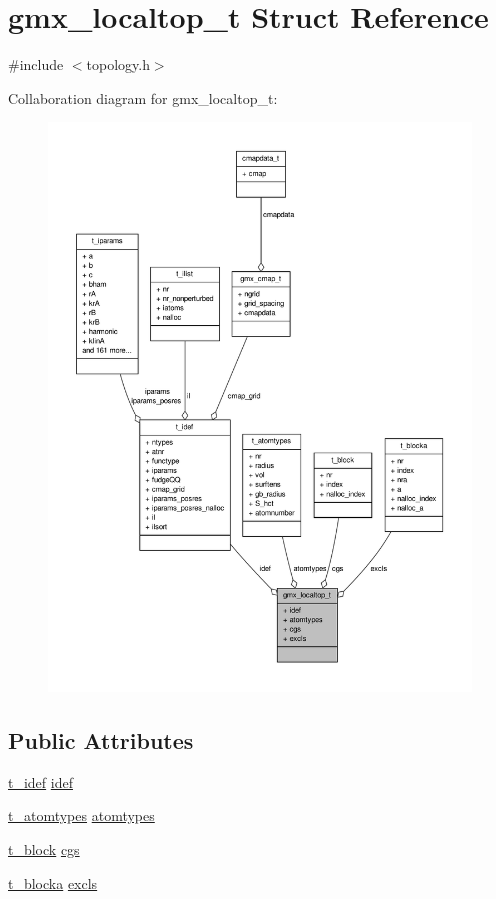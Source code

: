 \hypertarget{structgmx__localtop__t}{\section{gmx\-\_\-localtop\-\_\-t \-Struct \-Reference}
\label{structgmx__localtop__t}
}


{\ttfamily \#include $<$topology.\-h$>$}



\-Collaboration diagram for gmx\-\_\-localtop\-\_\-t\-:
\nopagebreak
\begin{figure}[H]
\begin{center}
\leavevmode
\includegraphics[width=350pt]{structgmx__localtop__t__coll__graph}
\end{center}
\end{figure}
\subsection*{\-Public \-Attributes}
\begin{DoxyCompactItemize}
\item 
\hyperlink{structt__idef}{t\-\_\-idef} \hyperlink{structgmx__localtop__t_ae4ece680912af6260e30529ac9afc6a4}{idef}
\item 
\hyperlink{structt__atomtypes}{t\-\_\-atomtypes} \hyperlink{structgmx__localtop__t_ae36182d83f3ec635da12842d77a36f59}{atomtypes}
\item 
\hyperlink{structt__block}{t\-\_\-block} \hyperlink{structgmx__localtop__t_a9540761c2b079decf62c838e06969db8}{cgs}
\item 
\hyperlink{structt__blocka}{t\-\_\-blocka} \hyperlink{structgmx__localtop__t_a9bac2d45b652cdf47491eec9f6aa6d75}{excls}
\end{DoxyCompactItemize}


